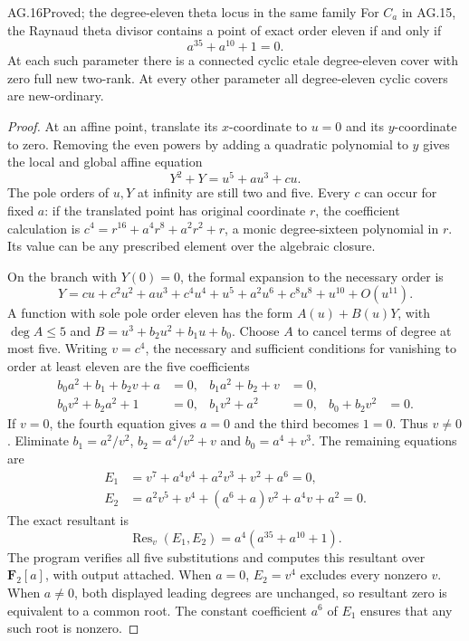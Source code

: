 \begin{claim}{AG.16}{Proved; the degree-eleven theta locus in the same family}
For $C_a$ in AG.15, the Raynaud theta divisor contains
a point of exact order eleven if and only if
\[
                           a^{35}+a^{10}+1=0.
\]
At each such parameter there is a connected cyclic
etale degree-eleven cover with zero full new two-rank.
At every other parameter all degree-eleven cyclic
covers are new-ordinary.
\end{claim}
\begin{proof}
At an affine point, translate its $x$-coordinate to
$u=0$ and its $y$-coordinate to zero. Removing the
even powers by adding a quadratic polynomial to $y$
gives the local and global affine equation
\[
                        Y^2+Y=u^5+a u^3+c u.
\]
The pole orders of $u,Y$ at infinity are still two
and five. Every $c$ can occur for fixed $a$: if the
translated point has original coordinate $r$, the
coefficient calculation is
$c^4=r^{16}+a^4r^8+a^2r^2+r$, a monic degree-sixteen
polynomial in $r$. Its value can be any prescribed
element over the algebraic closure.

On the branch with $Y(0)=0$, the formal expansion to
the necessary order is
\[
 Y=cu+c^2u^2+a u^3+c^4u^4+u^5
                       +a^2u^6+c^8u^8+u^{10}+O(u^{11}).
\]
A function with sole pole order eleven has the form
$A(u)+B(u)Y$, with $\deg A\le5$ and
$B=u^3+b_2u^2+b_1u+b_0$. Choose $A$ to cancel terms
of degree at most five. Writing $v=c^4$, the necessary
and sufficient conditions for vanishing to order at
least eleven are the five coefficients
\[
 \begin{aligned}
 b_0a^2+b_1+b_2v+a&=0,&
 b_1a^2+b_2+v&=0,\\
 b_0v^2+b_2a^2+1&=0,&
 b_1v^2+a^2&=0,&
 b_0+b_2v^2&=0.
 \end{aligned}
\]
If $v=0$, the fourth equation gives $a=0$ and the
third becomes $1=0$. Thus $v\ne0$. Eliminate
$b_1=a^2/v^2$, $b_2=a^4/v^2+v$ and
$b_0=a^4+v^3$. The remaining equations are
\[
 \begin{aligned}
 E_1&=v^7+a^4v^4+a^2v^3+v^2+a^6=0,\\
 E_2&=a^2v^5+v^4+(a^6+a)v^2+a^4v+a^2=0.
 \end{aligned}
\]
The exact resultant is
\[
              \operatorname{Res}_v(E_1,E_2)
                        =a^4(a^{35}+a^{10}+1).
\]
The program 
verifies all five substitutions and computes this
resultant over $\mathbf F_2[a]$, with output attached.
When $a=0$, $E_2=v^4$ excludes every nonzero $v$.
When $a\ne0$, both displayed leading degrees are
unchanged, so resultant zero is equivalent to a common
root. The constant coefficient $a^6$ of $E_1$
ensures that any such root is nonzero.


\end{proof}
